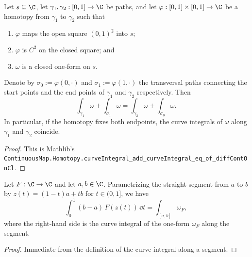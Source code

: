\begin{theorem}\label{thm:poincare-curveIntegral}\leanok
  Let $s \subseteq \C$, let $\gamma_1, \gamma_2 : [0,1] \to \C$ be paths, and let
  $\varphi : [0,1] \times [0,1] \to \C$ be a homotopy from $\gamma_1$ to $\gamma_2$ such that
  \begin{enumerate}
    \item $\varphi$ maps the open square $(0,1)^2$ into $s$;
    \item $\varphi$ is $C^2$ on the closed square; and
    \item $\omega$ is a closed one-form on $s$.
  \end{enumerate}
  Denote by $\sigma_0 := \varphi(0, \cdot)$ and $\sigma_1 := \varphi(1, \cdot)$ the transversal
  paths connecting the start points and the end points of $\gamma_1$ and $\gamma_2$ respectively.
  Then
  \[
    \int_{\gamma_1} \omega + \int_{\sigma_1} \omega
      = \int_{\gamma_2} \omega + \int_{\sigma_0} \omega.
  \]
  In particular, if the homotopy fixes both endpoints, the curve integrals of $\omega$ along
  $\gamma_1$ and $\gamma_2$ coincide.
\end{theorem}
\begin{proof}\leanok
  This is Mathlib's
  \texttt{ContinuousMap.Homotopy.curveIntegral\_add\_curveIntegral\_eq\_of\_diffContOnCl}.
\end{proof}

\begin{lemma}\label{lemma:curveIntegral-segment}\leanok
  Let $F : \C \to \C$ and let $a, b \in \C$. Parametrizing the straight segment from $a$ to $b$ by
  $z(t) = (1-t)a + tb$ for $t \in (0,1]$, we have
  \[
    \int_0^1 (b - a)\, F(z(t)) \,\dd t = \int_{[a,b]} \omega_F,
  \]
  where the right-hand side is the curve integral of the one-form $\omega_F$ along the segment.
\end{lemma}
\begin{proof}\leanok
  Immediate from the definition of the curve integral along a segment.
\end{proof}

